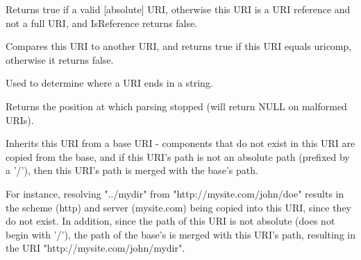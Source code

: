 Returns true if a valid [absolute] URI, otherwise this URI
is a URI reference and not a full URI, and IsReference
returns false.


\label{wxurioperatorcompare}


Compares this URI to another URI, and returns true if 
this URI equals uricomp, otherwise it returns false.



\label{wxuriextract}


Used to determine where a URI ends in a string.

Returns the position at which parsing stopped
(will return NULL on malformed URIs).



\label{wxuriresolve}


Inherits this URI from a base URI - components that do not
exist in this URI are copied from the base, and if this URI's
path is not an absolute path (prefixed by a '/'), then this URI's
path is merged with the base's path.

For instance, resolving "../mydir" from "http://mysite.com/john/doe" 
results in the scheme (http) and server (mysite.com) being copied into 
this URI, since they do not exist.  In addition, since the path
of this URI is not absolute (does not begin with '/'), the path
of the base's is merged with this URI's path, resulting in the URI
"http://mysite.com/john/mydir".



